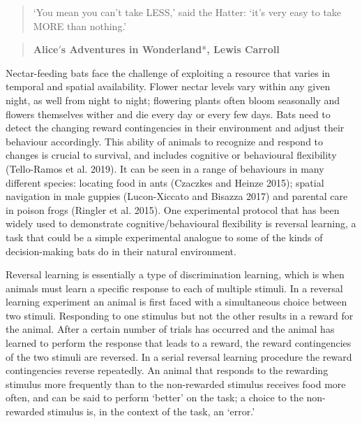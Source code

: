 \documentclass[
]{article}
\begin{document}
\begin{quote}
`You mean you can't take LESS,' said the Hatter: `it's very easy to take MORE than nothing.'
\end{quote}

\begin{quote}
\hfill *\textbf{Alice\('\)s Adventures in Wonderland}*\textbf{, Lewis Carroll}
\end{quote}

Nectar-feeding bats face the challenge of exploiting a resource that varies in temporal and spatial availability. Flower nectar levels vary within any given night, as well from night to night; flowering plants often bloom seasonally and flowers themselves wither and die every day or every few days. Bats need to detect the changing reward contingencies in their environment and adjust their behaviour accordingly. This ability of animals to recognize and respond to changes is crucial to survival, and includes cognitive or behavioural flexibility (Tello-Ramos et al. 2019). It can be seen in a range of behaviours in many different species: locating food in ants (Czaczkes and Heinze 2015); spatial navigation in male guppies (Lucon-Xiccato and Bisazza 2017) and parental care in poison frogs (Ringler et al. 2015). One experimental protocol that has been widely used to demonstrate cognitive/behavioural flexibility is reversal learning, a task that could be a simple experimental analogue to some of the kinds of decision-making bats do in their natural environment.

Reversal learning is essentially a type of discrimination learning, which is when animals must learn a specific response to each of multiple stimuli. In a reversal learning experiment an animal is first faced with a simultaneous choice between two stimuli. Responding to one stimulus but not the other results in a reward for the animal. After a certain number of trials has occurred and the animal has learned to perform the response that leads to a reward, the reward contingencies of the two stimuli are reversed. In a serial reversal learning procedure the reward contingencies reverse repeatedly. An animal that responds to the rewarding stimulus more frequently than to the non-rewarded stimulus receives food more often, and can be said to perform `better' on the task; a choice to the non-rewarded stimulus is, in the context of the task, an `error.'
\end{document}
